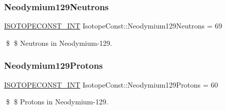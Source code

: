 \subsubsection{\texorpdfstring{Neodymium129\+Neutrons}{Neodymium129Neutrons}}
{\footnotesize\ttfamily \mbox{\hyperlink{group___isotope_const-_macros_ga5f18360b3e99483a35c32d789e62621c}{I\+S\+O\+T\+O\+P\+E\+C\+O\+N\+S\+T\+\_\+\+I\+NT}} Isotope\+Const\+::\+Neodymium129\+Neutrons = 69}

\$ \$ Neutrons in Neodymium-\/129. \mbox{\label{group___isotope_const-_neodymium-_nd129_gafacb48bddb4595adbe33e12ceb1ca17a}} 
\subsubsection{\texorpdfstring{Neodymium129\+Protons}{Neodymium129Protons}}
{\footnotesize\ttfamily \mbox{\hyperlink{group___isotope_const-_macros_ga5f18360b3e99483a35c32d789e62621c}{I\+S\+O\+T\+O\+P\+E\+C\+O\+N\+S\+T\+\_\+\+I\+NT}} Isotope\+Const\+::\+Neodymium129\+Protons = 60}

\$ \$ Protons in Neodymium-\/129. 